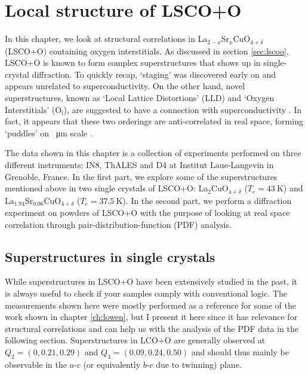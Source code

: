 \chapter{Local structure of LSCO+O}\label{ch:local}
In this chapter, we look at structural correlations in La$_{2-x}$Sr$_x$CuO$_{4+\delta}$ (LSCO+O) containing oxygen interstitials. As discussed in section \ref{sec:lscoo}, LSCO+O is known to form complex superstructures that shows up in single-crystal diffraction. To quickly recap, `staging' \cite{Wells1997,Ray2017} was discovered early on and appears unrelated to superconductivity. On the other hand, novel superstructures, known as `Local Lattice Distortions' (LLD) and `Oxygen Interstitials' (O$_\text{i}$), are suggested to have a connection with superconductivity \cite{Poccia2011}. In fact, it appears that these two orderings are anti-correlated in real space, forming `puddles' on \SI{}{\micro\meter} scale \cite{Poccia2012}.

The data shown in this chapter is a collection of experiments performed on three different instruments: IN8, ThALES and D4 at Institut Laue-Langevin in Grenoble, France. In the first part, we explore some of the superstructures mentioned above in two single crystals of LSCO+O: La$_2$CuO$_{4+\delta}$ ($T_\text{c} = \SI{43}{\kelvin}$) and La$_{1.94}$Sr$_{0.06}$CuO$_{4+\delta}$ ($T_\text{c} = \SI{37.5}{\kelvin}$). In the second part, we perform a diffraction experiment on powders of LSCO+O with the purpose of looking at real space correlation through pair-distribution-function (PDF) analysis.

\section{Superstructures in single crystals}\label{sec:single_crystal_superstructures}
While superstructures in LSCO+O have been extensively studied in the past, it is always useful to check if your samples comply with conventional logic. The measurements shown here were mostly performed as a reference for some of the work shown in chapter \ref{ch:lowen}, but I present it here since it has relevance for structural correlations and can help us with the analysis of the PDF data in the following section. Superstructures in LCO+O are generally observed at $Q_2 = (0, 0.21, 0.29)$ and $Q_3 = (0.09, 0.24, 0.50)$ \cite{Kusmartsev2000} and should thus mainly be observable in the $a$-$c$ (or equivalently $b$-$c$ due to twinning) plane.

